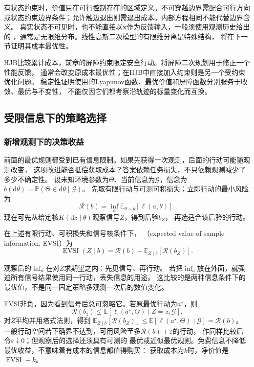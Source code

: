 有状态约束时，价值只在可行控制存在的区域定义。不可穿越边界需配合可行方向
或状态约束边界条件；允许触边退出则需退出成本。内部方程相同不能代替边界含义。
真实状态不可见时，也不能直接以$\bm x$作为反馈输入，一般须使用观测历史给出的
，通常是无限维分布。线性高斯二次模型的有限维分离是特殊结构，
将在下一节证明其成本最优性。

HJB比较累计成本，前章的屏障约束限定安全行动。将屏障二次规划用于修正一个性能反馈，
通常会改变原成本最优性；在HJB中直接加入约束则是另一个受约束优化问题。
稳定性证明使用的Lyapunov函数、最优价值和屏障函数分别服务于收敛、最优与不变性，
不能仅因它们都考察沿轨迹的标量变化而互换。

\subsection{受限信息下的策略选择}
\label{sec:decision-value-of-information}

\subsubsection{新增观测下的决策收益}

前面的最优规则都受到已有信息限制。如果先获得一次观测，后面的行动可能随观测改变，
这项改进能否抵偿获取成本？答案依赖任务损失，不只依赖观测减少了多少不确定性。
设未知环境参数为$\Theta$、当前信息为$\mathcal G$，信念为
$b(\mathrm d\theta)=\mathbb P(\Theta\in\mathrm d\theta\mid\mathcal G)$。
先取有限行动与可测可积损失；立即行动的最小风险为
\[
  \mathcal R(b)=\inf_a\mathbb E_{\theta\sim b}[\ell(a,\theta)].
\]
现在可先从给定核$K(\mathrm dz\mid\theta)$观察信号$Z$，得到后验$b_Z$，
再选适合该后验的行动。

\begin{definition}[期望样本信息价值]
\label{def:decision-expected-sample-information-value}
在上述有限行动、可积损失和信号核条件下，
（expected value of sample information, EVSI）为
\begin{equation}
  \operatorname{EVSI}(Z\mid b)
  =\mathcal R(b)-\mathbb E_{Z\mid b}[\mathcal R(b_Z)].
  \label{eq:decision-evsi}
\end{equation}
\end{definition}
观察后的$\inf_a$在对$Z$求期望之内：先见信号、再行动。
若把$\inf_a$放在外面，就强迫所有信号结果使用同一行动，丢失信息的用途。
这比较的是两种信息条件下的最优值，不是同一固定策略多观测一次后的数值变化。

EVSI非负，因为看到信号后总可忽略它。若原最优行动为$a^\star$，则
\[
  \mathcal R(b_z)\leq
  \mathbb E[\ell(a^\star,\Theta)\mid Z=z,\mathcal G].
\]
对$Z$平均并用塔式法则，得到
$\mathbb E_{Z\mid b}[\mathcal R(b_Z)]\leq
\mathbb E[\ell(a^\star,\Theta)\mid\mathcal G]=\mathcal R(b)$。
一般行动空间若下确界不达到，可用风险至多$\mathcal R(b)+\varepsilon$的行动，
作同样比较后令$\varepsilon\downarrow0$；但观察后的选择还须具有可测的
最优或近似最优规则。免费信息不降低最优收益，不意味着有成本的信息都值得购买：
获取成本为$k$时，净价值是$\operatorname{EVSI}-k$。

